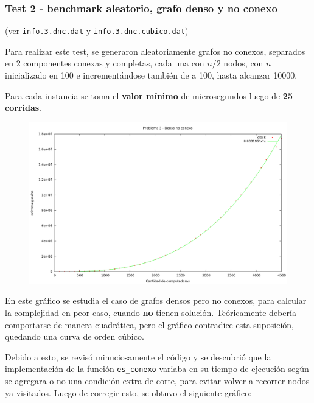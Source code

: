 \newpage
\subsubsection{Test 2 - benchmark aleatorio, grafo denso y no conexo}

(ver \verb|info.3.dnc.dat| y \verb|info.3.dnc.cubico.dat|) \medskip

Para realizar este test, se generaron aleatoriamente grafos no conexos, separados en 2 componentes conexas y completas, cada una con $n/2$ nodos, con  $n$ inicializado en 100 e incrementándose también de a 100, hasta alcanzar 10000.

Para cada instancia se toma el \textbf{valor mínimo} de microsegundos luego de
\textbf{25 corridas}.

\vspace*{0.5cm}

\begin{figure}[h]
  \begin{center}
    \includegraphics[scale=0.35]{imagenes/grafico-3-dnc-cubico.png}
  \end{center}
\end{figure}

\vspace*{0.5cm}

En este gráfico se estudia el caso de grafos densos pero no conexos,
para calcular la complejidad en peor caso, cuando \textbf{no} tienen solución.
Teóricamente debería comportarse de manera cuadrática, pero el gráfico contradice esta suposición, quedando una curva de orden cúbico.

Debido a esto, se revisó minuciosamente el código y se descubrió que la implementación de la función \verb|es_conexo| variaba en su tiempo de ejecución según se agregara o no una condición extra de corte, para evitar volver a recorrer nodos ya visitados. Luego de corregir esto, se obtuvo el siguiente gráfico:

